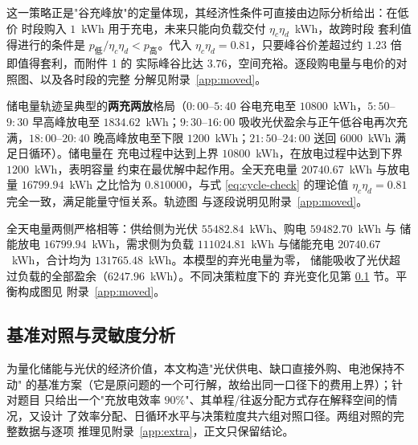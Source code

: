 \documentclass[withoutpreface,bwprint]{cumcmthesis}
\begin{document}
这一策略正是"谷充峰放"的定量体现，其经济性条件可直接由边际分析给出：在低价
时段购入 $1$~kWh 用于充电，未来只能向负载交付 $\eta_c\eta_d$~kWh，故跨时段
套利值得进行的条件是 $p_{\text{低}}/\eta_c\eta_d < p_{\text{高}}$。代入
$\eta_c\eta_d=0.81$，只要峰谷价差超过约 $1.23$ 倍即值得套利，而附件 1 的
实际峰谷比达 $3.76$，空间充裕。逐段购电量与电价的对照图、以及各时段的完整
分解见附录~\ref{app:moved}。

储电量轨迹呈典型的\textbf{两充两放}格局（$0{:}00$--$5{:}40$ 谷电充电至
$10800$~kWh，$5{:}50$--$9{:}30$ 早高峰放电至 $1834.62$~kWh；$9{:}30$--$16{:}00$
吸收光伏盈余与正午低谷电再次充满，$18{:}00$--$20{:}40$ 晚高峰放电至下限
$1200$~kWh；$21{:}50$--$24{:}00$ 送回 $6000$~kWh 满足日循环）。储电量在
充电过程中达到上界 $10800$~kWh，在放电过程中达到下界 $1200$~kWh，表明容量
约束在最优解中起作用。全天充电量 $20740.67$~kWh 与放电量 $16799.94$~kWh
之比恰为 $0.810000$，与式 \eqref{eq:cycle-check} 的理论值
$\eta_c\eta_d=0.81$ 完全一致，满足能量守恒关系。轨迹图
与逐段说明见附录~\ref{app:moved}。

全天电量两侧严格相等：供给侧为光伏 $55482.84$~kWh、购电 $59482.70$~kWh 与
储能放电 $16799.94$~kWh，需求侧为负载 $111024.81$~kWh 与储能充电
$20740.67$~kWh，合计均为 $131765.48$~kWh。本模型的弃光电量为零，
储能吸收了光伏超过负载的全部盈余（$6247.96$~kWh）。不同决策粒度下的
弃光变化见第 \ref{sec:sensitivity} 节。平衡构成图见
附录~\ref{app:moved}。


\subsection{基准对照与灵敏度分析}
\label{sec:sensitivity}

为量化储能与光伏的经济价值，本文构造"光伏供电、缺口直接外购、电池保持不动"
的基准方案（它是原问题的一个可行解，故给出同一口径下的费用上界）；针对题目
只给出一个"充放电效率 $90\%$"、其单程/往返分配方式存在解释空间的情况，又设计
了效率分配、日循环水平与决策粒度共六组对照口径。两组对照的完整数据与逐项
推理见附录~\ref{app:extra}，正文只保留结论。
\end{document}
